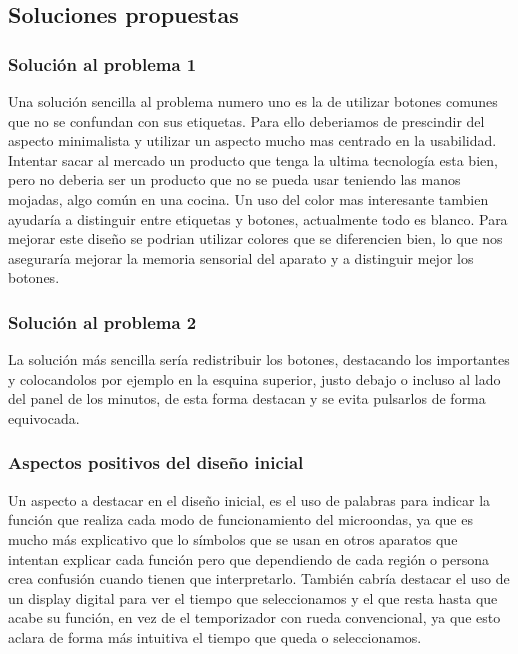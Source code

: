 \documentclass[a4paper,11pt]{article}
\begin{document}
\subsection{Soluciones propuestas}
\subsubsection{Solución al problema 1}
Una solución sencilla al problema numero uno es la de utilizar botones comunes que no se confundan con sus etiquetas. Para ello deberiamos de prescindir del aspecto minimalista y utilizar un aspecto mucho mas centrado en la usabilidad. Intentar sacar al mercado un producto que tenga la ultima tecnología esta bien, pero no deberia ser un producto que no se pueda usar teniendo las manos mojadas, algo común en una cocina.
Un uso del color mas interesante tambien ayudaría a distinguir entre etiquetas y botones, actualmente todo es blanco. Para mejorar este diseño se podrian utilizar colores que se diferencien bien, lo que nos aseguraría mejorar la memoria sensorial \cite{diapTema1} del aparato y a distinguir mejor los botones.

\subsubsection{Solución al problema 2}
La solución más sencilla sería redistribuir los botones, destacando los importantes y colocandolos por ejemplo en la esquina superior, justo debajo o incluso al lado del panel de los minutos, de esta forma destacan y se evita pulsarlos de forma equivocada.


\subsubsection{Aspectos positivos del diseño inicial}
Un aspecto a destacar en el diseño inicial, es el uso de palabras para indicar la función que realiza cada modo de funcionamiento del microondas, ya que es mucho más explicativo que lo símbolos que se usan en otros aparatos que intentan explicar cada función pero que dependiendo de cada región o persona crea confusión cuando tienen que interpretarlo. También cabría destacar el uso de un display digital para ver el tiempo que seleccionamos y el que resta hasta que acabe su función, en vez de el temporizador con rueda convencional, ya que esto aclara de forma más intuitiva el tiempo que queda o seleccionamos.
\end{document}
